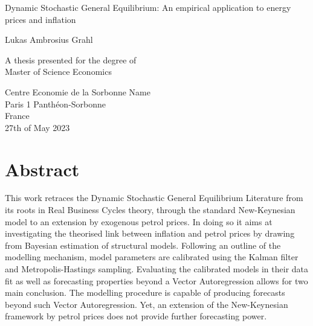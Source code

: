 \documentclass[12pt,a4paper,english]{article} %
\let\oldsection\section
\renewcommand\section{\clearpage\oldsection}
\begin{document}
	
	
	\begin{titlepage}
		\begin{center}
			\vspace*{1cm}
			
			\Large
			Dynamic Stochastic General Equilibrium: An empirical application to energy prices and inflation
			
			
			\vspace{1.5cm}
			
			Lukas Ambrosius Grahl
			
			\vfill
			
			A thesis presented for the degree of\\
			Master of Science Economics
			
			\vspace{5 cm}
			
		\end{center}
		Centre Economie de la Sorbonne Name\\
		Paris 1 Panthéon-Sorbonne \\
		France\\
		27th of May 2023
		
			
			

	\end{titlepage}

	\pagebreak

	\section*{Abstract}
	This work retraces the Dynamic Stochastic General Equilibrium Literature from its roots in Real Business Cycles theory, through the standard New-Keynesian model to an extension by exogenous petrol prices. In doing so it aims at investigating the theorised link between inflation and petrol prices by drawing from Bayesian estimation of structural models. 
	Following an outline of the modelling mechanism, model parameters are calibrated using the Kalman filter and Metropolis-Hastings sampling. Evaluating the calibrated models in their data fit as well as forecasting properties beyond a Vector Autoregression allows for two main conclusion. 
	The modelling procedure is capable of producing forecasts beyond such Vector Autoregression. Yet, an extension of the New-Keynesian framework by petrol prices does not provide further forecasting power.
	\pagebreak
	
\end{document}
